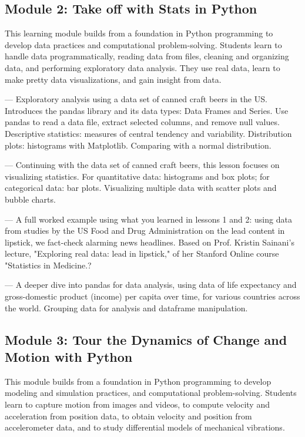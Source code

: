 \documentclass[10pt,journal,compsoc]{IEEEtran}
\begin{document}
\subsection{Module 2: Take off with Stats in Python}
This learning module builds from a foundation in Python programming to develop data practices and computational problem-solving. 
Students learn to handle data programmatically, reading data from files, cleaning and organizing data, and performing exploratory data analysis. 
They use real data, learn to make pretty data visualizations, and gain insight from data.

\begin{description}[style=unboxed]

\item[Lesson 1: Cheers! Stats with beers]---
Exploratory analysis using a data set of canned craft beers in the US. Introduces the pandas library and its data types: Data Frames and Series. Use pandas to read a data file, extract selected columns, and remove null values. Descriptive statistics: measures of central tendency and variability. Distribution plots: histograms with Matplotlib. Comparing with a normal distribution.

\item[Lesson 2: Seeing stats in a new light]---
Continuing with the data set of canned craft beers, this lesson focuses on visualizing statistics. For quantitative data: histograms and box plots; for categorical data: bar plots. Visualizing multiple data with scatter plots and bubble charts.

\item[Lesson 3: Lead in lipstick]---
A full worked example using what you learned in lessons 1 and 2: using data from studies by the US Food and Drug Administration on the lead content in lipstick, we fact-check alarming news headlines. Based on Prof. Kristin Sainani's lecture, "Exploring real data: lead in lipstick," of her Stanford Online course "Statistics in Medicine.?

\item[Lesson 4: Life expectancy and wealth]---
A deeper dive into pandas for data analysis, using data of life expectancy and gross-domestic product (income) per capita over time, for various countries across the world. Grouping data for analysis and dataframe manipulation.

\end{description}

\subsection{Module 3: Tour the Dynamics of Change and Motion with Python}
This module builds from a foundation in Python programming to develop modeling and simulation practices, and computational problem-solving. 
Students learn to capture motion from images and videos, to compute velocity and acceleration from position data, to obtain velocity and position from accelerometer data, and to study differential models of mechanical vibrations.
\end{document}
